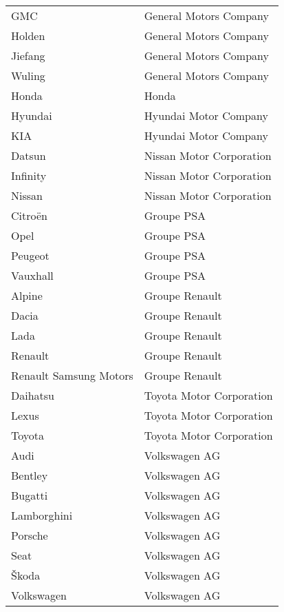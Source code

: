 \begin{longtable}[c]{ll}
  GMC & General Motors Company \cite[p.1]{GeneralMotorsCompany2018} \\
  Holden & General Motors Company \cite[p.1]{GeneralMotorsCompany2018} \\
  Jiefang & General Motors Company \cite[p.1]{GeneralMotorsCompany2018} \\
  Wuling & General Motors Company \cite[p.1]{GeneralMotorsCompany2018} \\
  Honda & Honda \cite[p.3]{HondaMotorCo.2017} \\
  Hyundai & Hyundai Motor Company \cite[p.127]{HyundaiMotorCompany2016} \\
  KIA & Hyundai Motor Company \cite[p.127]{HyundaiMotorCompany2016} \\
  Datsun & Nissan Motor Corporation \cite[p.5]{NissanMotorCorporation2017} \\
  Infinity & Nissan Motor Corporation \cite[p.5]{NissanMotorCorporation2017} \\
  Nissan & Nissan Motor Corporation \cite[p.5]{NissanMotorCorporation2017} \\
  Citroën & Groupe PSA \cite[p.3]{GroupePSA2018} \\
  Opel & Groupe PSA \cite[p.3]{GroupePSA2018} \\
  Peugeot& Groupe PSA \cite[p.3]{GroupePSA2018} \\
  Vauxhall & Groupe PSA \cite[p.3]{GroupePSA2018} \\
  Alpine & Groupe Renault \cite[p.11]{GroupeRenault2018} \\
  Dacia & Groupe Renault \cite[p.11]{GroupeRenault2018} \\
  Lada & Groupe Renault \cite[p.11]{GroupeRenault2018} \\
  Renault & Groupe Renault \cite[p.10]{GroupeRenault2018} \\
  Renault Samsung Motors & Groupe Renault \cite[p.10]{GroupeRenault2018} \\
  Daihatsu & Toyota Motor Corporation \cite[p.2]{ToyotaMotorCorporation2018} \\
  Lexus & Toyota Motor Corporation \cite[p.2]{ToyotaMotorCorporation2018} \\
  Toyota & Toyota Motor Corporation \cite[p.2]{ToyotaMotorCorporation2018} \\
  Audi & Volkswagen AG \cite[p.104]{VolkswagenAktiengesellschaft2017} \\
  Bentley & Volkswagen AG \cite[p.104]{VolkswagenAktiengesellschaft2017} \\
  Bugatti & Volkswagen AG \cite[p.104]{VolkswagenAktiengesellschaft2017} \\
  Lamborghini & Volkswagen AG \cite[p.104]{VolkswagenAktiengesellschaft2017} \\
  Porsche & Volkswagen AG \cite[p.104]{VolkswagenAktiengesellschaft2017} \\
  Seat & Volkswagen AG \cite[p.104]{VolkswagenAktiengesellschaft2017} \\
  Škoda & Volkswagen AG \cite[p.104]{VolkswagenAktiengesellschaft2017} \\
  Volkswagen & Volkswagen AG \cite[p.104]{VolkswagenAktiengesellschaft2017} \\ \hline
  

\end{longtable}
